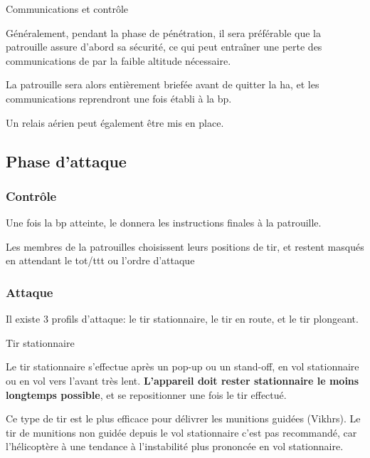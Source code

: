	\item Communications et contrôle

	\ee
		\item
		Généralement, pendant la phase de pénétration, il sera préférable que la patrouille assure d'abord sa sécurité, ce qui peut entraîner une perte des communications de par la faible altitude nécessaire.
		\item La patrouille sera alors entièrement briefée avant de quitter la \gls{ha}, et les communications reprendront une fois établi à la \gls{bp}.
		\item Un relais aérien peut également être mis en place.
	\ed
\ed

\subsection{Phase d'attaque}

\subsubsection{Contrôle}

\e
	\item Une fois la \gls{bp} atteinte, le \ja{} donnera les instructions finales à la patrouille.
	\item Les membres de la patrouilles choisissent leurs positions de tir, et restent masqués en attendant le \gls{tot}/\gls{ttt} ou l'ordre d'attaque
\ed

\subsubsection{Attaque}

\e
	\item Il existe 3 profils d'attaque: le tir stationnaire, le tir en route, et le tir plongeant.

	\item Tir stationnaire

	\ee
		\item
		Le tir stationnaire s'effectue après un pop-up ou un stand-off, en vol stationnaire ou en vol vers l'avant très lent. \textbf{L'appareil doit rester stationnaire le moins longtemps possible}, et se repositionner une fois le tir effectué.
		\item
		Ce type de tir est le plus efficace pour délivrer les munitions guidées (Vikhrs). Le tir de munitions non guidée depuis le vol stationnaire c'est pas recommandé, car l'hélicoptère à une tendance à l'instabilité plus prononcée en vol stationnaire.
	\ed

